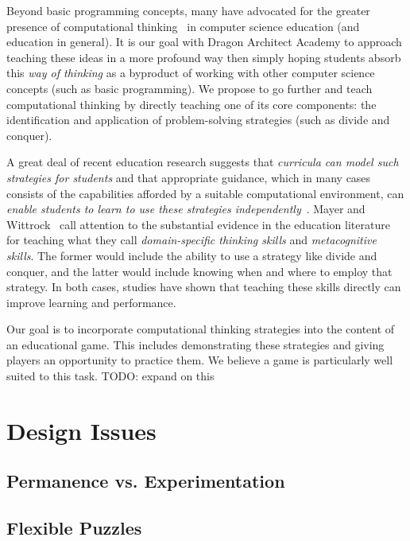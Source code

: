 \documentclass{sig-alternate}
\newcommand{\TODO}[1]{{\color{red} TODO: #1}}
\newcommand{\gametitle}{{\color{RoyalPurple} Dragon Architect Academy}}
\begin{document}
Beyond basic programming concepts, many have advocated for the greater presence of computational thinking~\cite{wing2008computational} in computer science education (and education in general). It is our goal with \gametitle{} to approach teaching these ideas in a more profound way then simply hoping students absorb this \emph{way of thinking} as a byproduct of working with other computer science concepts (such as basic programming). We propose to go further and teach computational thinking by directly teaching one of its core components: the identification and application of problem-solving strategies (such as divide and conquer). 

A great deal of recent education research suggests that \emph{curricula can model such strategies for students} and that appropriate guidance, which in many cases consists of the capabilities afforded by a suitable computational environment, can \emph{enable students to learn to use these strategies independently}~\cite{report2010computational}. Mayer and Wittrock~\cite{mayer1996handbook} call attention to the substantial evidence in the education literature for teaching what they call \emph{domain-specific thinking skills} and \emph{metacognitive skills}. The former would include the ability to use a strategy like divide and conquer, and the latter would include knowing when and where to employ that strategy. In both cases, studies have shown that teaching these skills directly can improve learning and performance. 

Our goal is to incorporate computational thinking strategies into the content of an educational game. This includes demonstrating these strategies and giving players an opportunity to practice them. We believe a game is particularly well suited to this task. \TODO{expand on this}


\section{Design Issues}


\subsection{Permanence vs. Experimentation}

\subsection{Flexible Puzzles}
\end{document}
